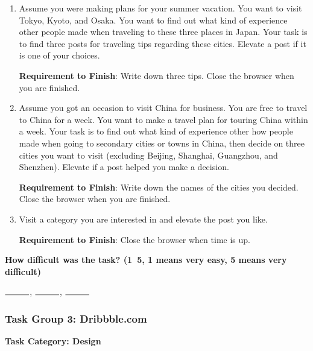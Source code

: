 \begin{enumerate}
    \item Assume you were making plans for your summer vacation. You want to visit Tokyo, Kyoto, and Osaka. 
          You want to find out what kind of experience other people made 
          when traveling to these three places in Japan. Your task is to find three posts 
          for traveling tips regarding these cities. Elevate a post if it is one of your choices.

          \textbf{Requirement to Finish}: Write down three tips.
          Close the browser when you are finished.

          \item Assume you got an occasion to visit China for business. You are free to travel to China for a week. 
          You want to make a travel plan for touring China within a week. Your task is to find out what kind 
          of experience other how people made when going to secondary cities or towns in China, then decide 
          on three cities you want to visit (excluding  Beijing, Shanghai, Guangzhou, and Shenzhen). 
          Elevate if a post helped you make a decision. 

          \textbf{Requirement to Finish}: Write down the names of the cities you decided. 
          Close the browser when you are finished.

    \item Visit a category you are interested in and elevate the post you like. 
    
          \textbf{Requirement to Finish}: Close the browser when time is up.
\end{enumerate}

\textbf{How difficult was the task? (1~5, 1 means very easy, 5 means very difficult)}

$\rule{1cm}{0.15mm}$, $\rule{1cm}{0.15mm}$, $\rule{1cm}{0.15mm}$

\subsubsection{Task Group 3: Dribbble.com}

\textbf{Task Category: Design}

